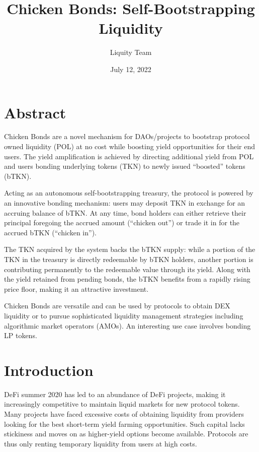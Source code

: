 \documentclass{article}
\begin{document}
\title{\textbf{Chicken Bonds: Self-Bootstrapping Liquidity}}
\author{Liquity Team}
\date{July 12, 2022}

\maketitle

\section*{Abstract}
Chicken Bonds are a novel mechanism for DAOs/projects to bootstrap protocol owned liquidity (POL) at no cost while boosting yield opportunities for their end users. The yield amplification is achieved by directing additional yield from POL and users bonding underlying tokens (TKN) to newly issued “boosted” tokens (bTKN). 

Acting as an autonomous self-bootstrapping treasury, the protocol is powered by an innovative bonding mechanism: users may deposit TKN in exchange for an accruing balance of bTKN. At any time, bond holders can either retrieve their principal foregoing the accrued amount (“chicken out”) or trade it in for the accrued bTKN (“chicken in”).

The TKN acquired by the system backs the bTKN supply: while a portion of the TKN in the treasury is directly redeemable by bTKN holders, another portion is contributing permanently to the redeemable value through its yield. Along with the yield retained from pending bonds, the bTKN benefits from a rapidly rising price floor,  making it an attractive investment.

Chicken Bonds are versatile and can be used by protocols to obtain DEX liquidity or to pursue sophisticated liquidity management strategies including algorithmic market operators (AMOs). An interesting use case involves bonding LP tokens.

\tableofcontents

\section{Introduction}
DeFi summer 2020 has led to an abundance of DeFi projects, making it increasingly competitive to maintain liquid markets for new protocol tokens. Many projects have faced excessive costs of obtaining liquidity from providers looking for the best short-term yield farming opportunities. Such capital lacks stickiness and moves on as higher-yield options become available. Protocols are thus only renting temporary liquidity from users at high costs.
\end{document}
